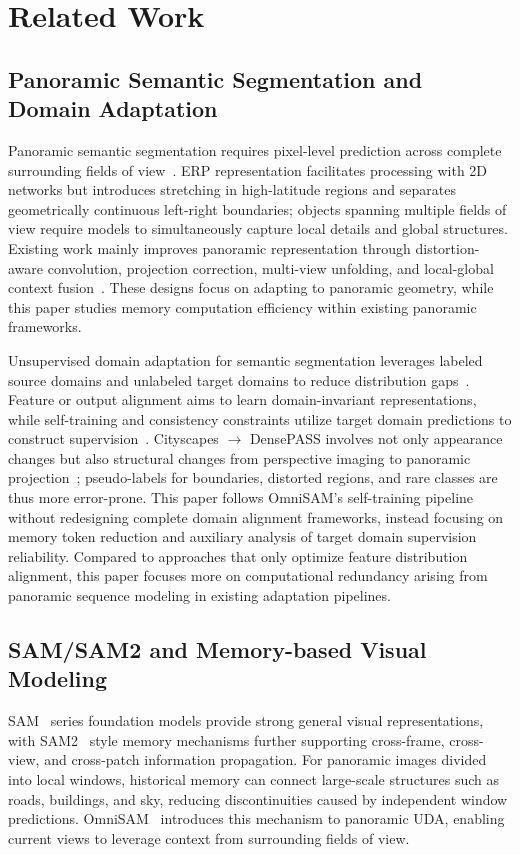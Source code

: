 \section{Related Work}
\label{sec:related_work}

\subsection{Panoramic Semantic Segmentation and Domain Adaptation}
Panoramic semantic segmentation requires pixel-level prediction across complete surrounding fields of view~\cite{ma2021densepass,yang2021omnirange}. ERP representation facilitates processing with 2D networks but introduces stretching in high-latitude regions and separates geometrically continuous left-right boundaries; objects spanning multiple fields of view require models to simultaneously capture local details and global structures. Existing work mainly improves panoramic representation through distortion-aware convolution, projection correction, multi-view unfolding, and local-global context fusion~\cite{zhang2022bending,zheng2023dppass,zheng2023datr}. These designs focus on adapting to panoramic geometry, while this paper studies memory computation efficiency within existing panoramic frameworks.

Unsupervised domain adaptation for semantic segmentation leverages labeled source domains and unlabeled target domains to reduce distribution gaps~\cite{tsai2018adaptsegnet,zou2018cbst}. Feature or output alignment aims to learn domain-invariant representations, while self-training and consistency constraints utilize target domain predictions to construct supervision~\cite{hoyer2022daformer,hoyer2022hrda,hoyer2023mic}. Cityscapes $\rightarrow$ DensePASS involves not only appearance changes but also structural changes from perspective imaging to panoramic projection~\cite{zhang2024goodsam,zhong2025omnisam}; pseudo-labels for boundaries, distorted regions, and rare classes are thus more error-prone. This paper follows OmniSAM's self-training pipeline without redesigning complete domain alignment frameworks, instead focusing on memory token reduction and auxiliary analysis of target domain supervision reliability. Compared to approaches that only optimize feature distribution alignment, this paper focuses more on computational redundancy arising from panoramic sequence modeling in existing adaptation pipelines.

\subsection{SAM/SAM2 and Memory-based Visual Modeling}
SAM~\cite{kirillov2023segment} series foundation models provide strong general visual representations, with SAM2~\cite{ravi2025sam2} style memory mechanisms further supporting cross-frame, cross-view, and cross-patch information propagation. For panoramic images divided into local windows, historical memory can connect large-scale structures such as roads, buildings, and sky, reducing discontinuities caused by independent window predictions. OmniSAM~\cite{zhong2025omnisam} introduces this mechanism to panoramic UDA, enabling current views to leverage context from surrounding fields of view.


